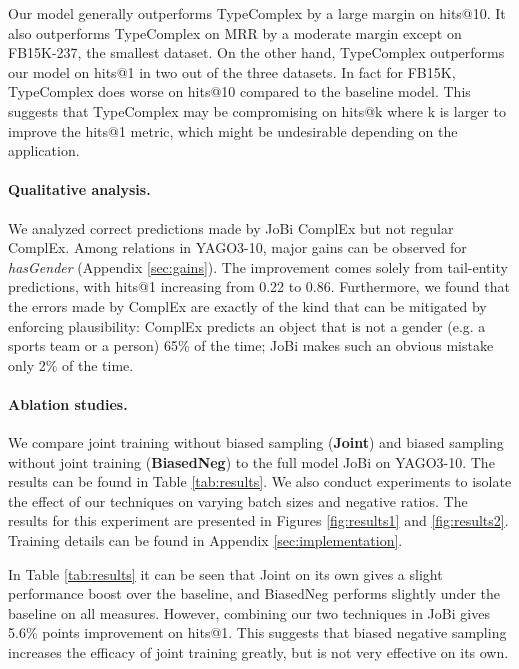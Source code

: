 \documentclass[11pt,a4paper, dvipsnames]{article}
\begin{document}
Our model generally outperforms TypeComplex by a large margin on hits@10. It also outperforms TypeComplex on MRR by a moderate margin except on FB15K-237, the smallest dataset. On the other hand, TypeComplex outperforms our model on hits@1 in two out of the three datasets. In fact for FB15K, TypeComplex does worse on hits@10 compared to the baseline model. This suggests that TypeComplex may be compromising on hits@k where k is larger to improve the hits@1 metric, which might be undesirable depending on the application. 

\paragraph{Qualitative analysis.} We analyzed correct predictions made by JoBi ComplEx but not regular ComplEx. Among relations in YAGO3-10, major gains can be observed for \textit{hasGender} (Appendix \ref{sec:gains}). The improvement comes solely from tail-entity predictions, with hits@1 increasing from 0.22 to 0.86. Furthermore, we found that the errors made by ComplEx are exactly of the kind that can be mitigated by enforcing plausibility: ComplEx predicts an object that is not a gender (e.g. a sports team or a person) 65\% of the time; JoBi makes such an obvious mistake only 2\% of the time. 


\paragraph{Ablation studies.} We compare joint training without biased sampling (\textbf{Joint}) and biased sampling without joint training (\textbf{BiasedNeg}) to the full model JoBi on YAGO3-10. The results can be found in Table \ref{tab:results}.  We also conduct experiments to isolate the effect of our techniques on varying batch sizes and negative ratios. The results for this experiment are presented in Figures \ref{fig:results1} and \ref{fig:results2}.  Training details can be found in Appendix \ref{sec:implementation}. 

In Table \ref{tab:results} it can be seen that Joint on its own gives a slight performance boost over the baseline, and BiasedNeg performs slightly under the baseline on all measures. However, combining our two techniques in JoBi gives 5.6\% points improvement on hits@1. This suggests that biased negative sampling increases the efficacy of joint training greatly, but is not very effective on its own.
\end{document}
